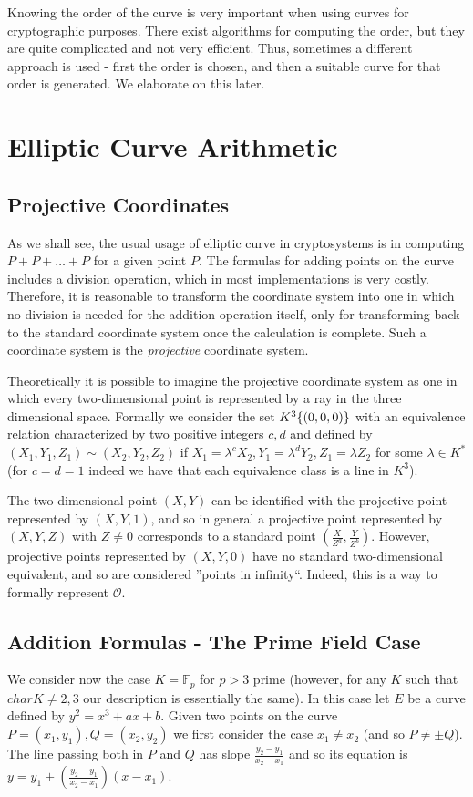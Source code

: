 \documentclass[11pt,english]{article}
\begin{document}
Knowing the order of the curve is very important when using curves for cryptographic purposes. There exist algorithms for computing the order, but
they are quite complicated and not very efficient. Thus, sometimes a different approach is used - first the order is chosen, and then a suitable curve
for that order is generated. We elaborate on this later.
\section{Elliptic Curve Arithmetic}
\subsection{Projective Coordinates}
As we shall see, the usual usage of elliptic curve in cryptosystems is in computing $P+P+\dots+P$ for a given point $P$. 
The formulas for adding points on the curve includes a division operation, which in most implementations is very costly. Therefore, it is reasonable to
transform the coordinate system into one in which no division is needed for the addition operation itself, only for transforming back to the standard
coordinate system once the calculation is complete. Such a coordinate system is the \emph{projective} coordinate system.

Theoretically it is possible to imagine the projective coordinate system as one in which every two-dimensional point is represented by a ray in the three
dimensional space. Formally we consider the set $K^3\\\{(0,0,0)\}$ with an equivalence relation characterized by two positive integers $c,d$ and
defined by $(X_1,Y_1,Z_1)\sim (X_2,Y_2,Z_2)$ if $X_1=\lambda^cX_2,Y_1=\lambda^dY_2,Z_1=\lambda Z_2$ for some $\lambda\in K^*$ (for $c=d=1$
indeed we have that each equivalence class is a line in $K^3$).

The two-dimensional point $(X,Y)$ can be identified with the projective point represented by $(X,Y,1)$, and so in general a projective point represented by
$(X,Y,Z)$ with $Z\ne 0$ corresponds to a standard point $(\frac{X}{Z^a},\frac{Y}{Z^b})$. However, projective points represented by $(X,Y,0)$
have no standard two-dimensional equivalent, and so are considered ''points in infinity``. Indeed, this is a way to formally represent $\mathcal{O}$.

\subsection{Addition Formulas - The Prime Field Case}
We consider now the case $K=\mathbb{F}_p$ for $p>3$ prime (however, for any $K$ such that $char K\ne 2,3$ our description is essentially the same).
In this case let $E$ be a curve defined by $y^2=x^3+ax+b$. Given two points on the curve $P=(x_1,y_1),Q=(x_2,y_2)$ we first consider the case $x_1\ne x_2$
(and so $P\ne\pm Q$). The line passing both in $P$ and $Q$ has slope $\frac{y_2-y_1}{x_2-x_1}$ and so its equation is $y=y_1+\left(\frac{y_2-y_1}{x_2-x_1}\right)(x-x_1)$.
\end{document}
